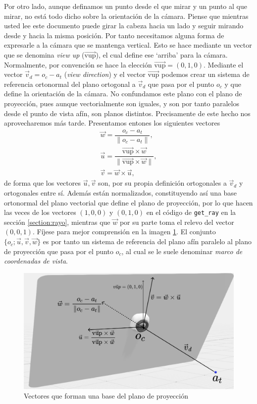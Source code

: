 Por otro lado, aunque definamos un punto desde el que mirar y un punto al que mirar, no está todo dicho sobre la orientación de la cámara. Piense que mientras usted lee este documento puede girar la cabeza hacia un lado y seguir mirando desde y hacia la misma posición. Por tanto necesitamos alguna forma de expresarle a la cámara que se mantenga vertical. Esto se hace mediante un vector que se denomina \textit{view up} ($\overrightarrow{\mathrm{vup}}$), el cual define ese `arriba' para la cámara. Normalmente, por convención se hace la elección $\overrightarrow{\mathrm{vup}}=(0,1,0)$. Mediante el vector $\vec{v}_d=o_c-a_t$ (\textit{view direction}) y el vector $\overrightarrow{\mathrm{vup}}$ podemos crear un sistema de referencia ortonormal del plano ortogonal a $\vec{v}_d$ que pasa por el punto $o_c$ y que define la orientación de la cámara. No confundamos este plano con el plano de proyección, pues aunque vectorialmente son iguales, y son por tanto paralelos desde el punto de vista afín, son planos distintos. Precisamente de este hecho nos aprovecharemos más tarde. Presentamos entones los siguientes vectores
\begin{eqnarray*}
    \vec w = \dfrac{o_c-a_t}{\|o_c-a_t\|}, \\
    \vec u = \dfrac{\overrightarrow{\mathrm{vup}}\times \vec w}{\|\overrightarrow{\mathrm{vup}} \times \vec w\|}, \\
    \vec v = \vec w\times \vec u,
\end{eqnarray*}
de forma que los vectores $\vec u,\vec v$ son, por su propia definición ortogonales a $\vec{v}_d$ y ortogonales entre sí. Además están normalizados, constituyendo así una base ortonormal del plano vectorial que define el plano de proyección, por lo que hacen las veces de los vectores $(1,0,0)$ y $(0,1,0)$ en el código de \verb|get_ray| en la sección \ref{section:rayo}, mientras que $\vec w$ por su parte toma el relevo del vector $(0,0,1)$. Fíjese para mejor comprensión en la imagen \ref{fig:vectores}. El conjunto $\{o_c; \vec u, \vec v,\vec w\}$ es por tanto un sistema de referencia del plano afín paralelo al plano de proyección que pasa por el punto $o_c$, al cual se le suele denominar \textit{marco de coordenadas de vista}.

\begin{figure} [ht]
    \centering
    \includegraphics[scale = 0.25]{img/C8/plano.png}
    \caption{Vectores que forman una base del plano de proyección}
    \label{fig:vectores}
\end{figure}

